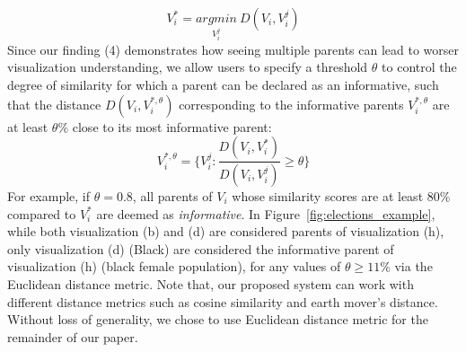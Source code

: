 \begin{equation}
    V_i^*=\underset{V_i^j}{argmin}\ D(V_i, V_i^j)
\end{equation}
Since our finding (4) demonstrates how seeing multiple parents can lead to worser visualization understanding, we allow users to specify a threshold $\theta$ to control the degree of similarity for which a parent can be declared as an informative, such that the distance $D(V_i, V_i^{*, \theta})$ corresponding to the informative parents $V_i^{*, \theta}$ are at least $\theta\%$ close to its most informative parent:
\begin{equation}
    V_i^{*, \theta} = \{V_i^j : \frac{D(V_i, V_i^*)}{D(V_i, V_i^j)} \geq \theta\}
\end{equation}
For example, if $\theta = 0.8$, all parents of $V_i$ whose similarity scores are at least 80\% compared to $V_i^*$ are deemed as \textit{informative}. In Figure~\ref{fig:elections_example}, while both visualization (b) and (d) are considered parents of visualization (h), only visualization (d) (Black) are considered the informative parent of visualization (h) (black female population), for any values of $\theta \geq 11\%$ via the Euclidean distance metric. Note that, our proposed system can work with different distance metrics such as cosine similarity and earth mover's distance. Without loss of generality, we chose to use Euclidean distance metric for the remainder of our paper.


